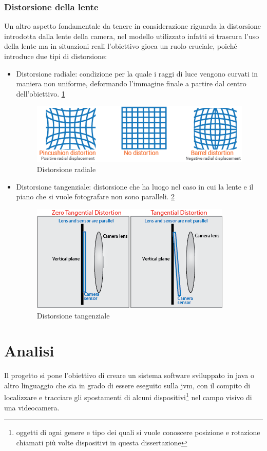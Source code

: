 \documentclass[12pt,a4paper,openright,twoside]{book}
\begin{document}
\subsection{Distorsione della lente}
Un altro aspetto fondamentale da tenere in considerazione riguarda la distorsione introdotta dalla lente della camera, nel modello utilizzato infatti si trascura l'uso della lente ma in situazioni reali l'obiettivo gioca un ruolo cruciale, poiché introduce due tipi di distorsione:
\begin{itemize}
	\item Distorsione radiale: condizione per la quale i raggi di luce vengono curvati in maniera non uniforme, deformando l'immagine finale a partire dal centro dell'obiettivo. \ref{fig:radial_distortion}
	\begin{figure}[h!]
		\centering
		\includegraphics[width=0.5\linewidth]{./figures/radial_distortion.png}
		\caption{Distorsione radiale}
		\label{fig:radial_distortion}
	\end{figure}
	\item  Distorsione tangenziale: distorsione che ha luogo nel caso in cui la lente e il piano che si vuole fotografare non sono paralleli. \ref{fig:tangential_distortion}
	\begin{figure}[h!]
		\centering
		\includegraphics[width=0.5\linewidth]{./figures/tangential_distortion.png}
		\caption{Distorsione tangenziale}
		\label{fig:tangential_distortion}
	\end{figure}
\end{itemize} 

\chapter{Analisi}
Il progetto si pone l'obiettivo di creare un sistema software sviluppato in java o altro linguaggio che sia in grado di essere eseguito sulla \acrfull{jvm}, con il compito di localizzare e tracciare gli spostamenti di alcuni dispositivi\footnote{oggetti di ogni genere e tipo dei quali si vuole conoscere posizione e rotazione chiamati più volte dispositivi in questa dissertazione} nel campo visivo di una videocamera.
\end{document}
